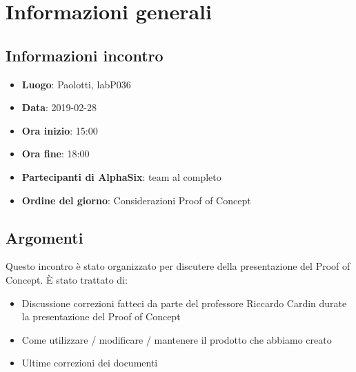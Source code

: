 \newcommand{\documento}{\VI}
\newcommand{\nomedocumentofisico}{VI\_2019-02-28.pdf}
\newcommand{\redazione}{\MM}
\newcommand{\verifica}{\CV}
\newcommand{\approvazione}{\SG}
\newcommand{\versione}{1.0.0}
\newcommand{\uso}{Interno}
\newcommand{\destinateTo}{\gruppo}
\newcommand{\datacreazione}{01 marzo 2019}
\newcommand{\datamodifica}{03 marzo 2019}
\newcommand{\stato}{Approvato}

\def\TABELLE{false}	%
\def\FIGURE{false} 	%






    

    	
    
    \section{Informazioni generali}
		\subsection{Informazioni incontro}
			\begin{itemize}
				\item {\textbf{Luogo}: Paolotti, labP036}
				\item {\textbf{Data}: 2019-02-28}
				\item {\textbf{Ora inizio}: 15:00}
				\item {\textbf{Ora fine}: 18:00}
				\item {\textbf{Partecipanti di AlphaSix}: team al completo}
				\item {\textbf{Ordine del giorno}: Considerazioni Proof of Concept}
			\end{itemize}

        \subsection{Argomenti}
            Questo incontro è stato organizzato per discutere della presentazione del Proof of Concept. È stato trattato di:
            \begin{itemize}
                \item Discussione correzioni fatteci da parte del professore Riccardo Cardin durate la presentazione del Proof of Concept
                \item Come utilizzare / modificare / mantenere il prodotto che abbiamo creato
                \item Ultime correzioni dei documenti
            \end{itemize}

